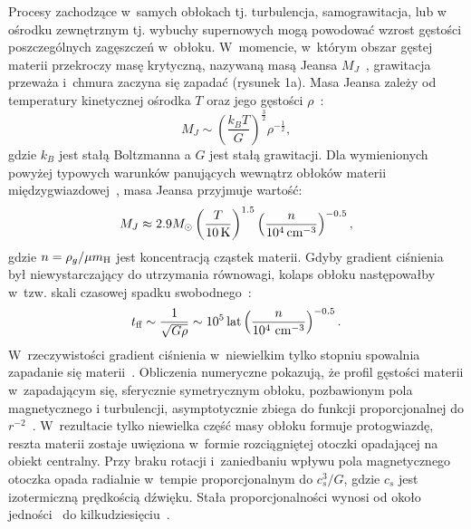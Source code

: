 \par Procesy zachodzące w~samych obłokach tj. turbulencja, samograwitacja, lub
w ośrodku zewnętrznym tj.  wybuchy supernowych mogą powodować wzrost gęstości
poszczególnych zagęszczeń w~obłoku. W~momencie, w~którym obszar gęstej materii
przekroczy  masę krytyczną, nazywaną masą Jeansa $M_J$~\cite{J1902, J1928},
grawitacja przeważa i~chmura zaczyna się zapadać (rysunek 1a). Masa Jeansa
zależy od temperatury kinetycznej ośrodka $T$ oraz jego gęstości
$\rho$~\cite{H64}:
%
\begin{equation} M_J \sim
   \left( \frac{k_B T}{G} \right) ^\frac{3}{2} {\rho}^{-\frac{1}{2}},
\end{equation}
%
gdzie $k_B$ jest stałą Boltzmanna a $G$ jest stałą grawitacji.
Dla wymienionych powyżej typowych warunków panujących wewnątrz obłoków materii
międzygwiazdowej~\cite{BM89}, masa Jeansa przyjmuje wartość:
%
\begin{equation}
 M_J \approx 2.9 M_{\odot} \left(\frac{T}{10\hbox{$\thinspace\textrm{K}$}}\right)^{1.5} 
 \left(\frac{n}{10^4\hbox{$\thinspace\textrm{cm}$}^{-3}}\right)^{-0.5},
\end{equation}
%
gdzie $n = \rho_g / \mu \hbox{$m_{\textrm{H}}$}$ jest koncentracją cząstek materii.
Gdyby gradient ciśnienia był niewystarczający do utrzymania równowagi, kolaps
obłoku następowałby w~tzw. skali czasowej spadku swobodnego~\cite{Spitzer1978}:
%
\begin{equation}
   t_{\textrm{ff}} \sim \frac{1}{\sqrt{G\rho}} \sim 10^5\hbox{$\thinspace\textrm{lat}$}
   \left(\frac{n}{10^4\thinspace \hbox{$\thinspace\textrm{cm}$}^{-3}}\right)^{-0.5}.
\end{equation}
%
W~rzeczywistości gradient ciśnienia w~niewielkim tylko stopniu spowalnia
zapadanie się materii~\cite{T82}. Obliczenia numeryczne pokazują, że profil
gęstości materii w~zapadającym się, sferycznie symetrycznym obłoku, pozbawionym
pola magnetycznego i turbulencji, asymptotycznie zbiega do funkcji
proporcjonalnej do $r^{-2}$~\cite{L69}. W~rezultacie tylko niewielka część masy
obłoku formuje protogwiazdę, reszta materii zostaje uwięziona w~formie
rozciągniętej otoczki opadającej na obiekt centralny. Przy braku rotacji
i~zaniedbaniu wpływu pola magnetycznego otoczka opada radialnie w~tempie
proporcjonalnym do $c_s^3 / G$, gdzie $c_s$ jest izotermiczną prędkością
dźwięku.  Stała proporcjonalności wynosi od około jedności~\cite{S77} do
kilkudziesięciu~\cite{H77}.

